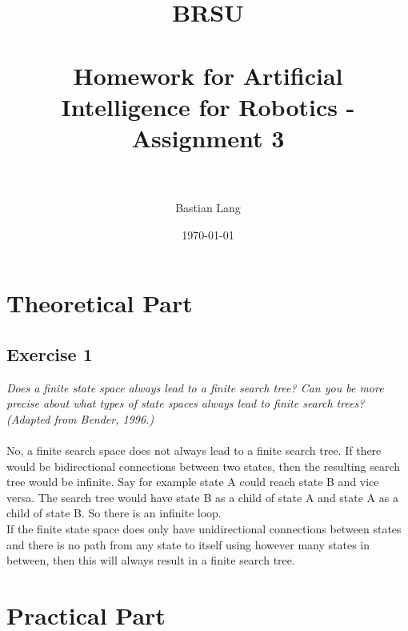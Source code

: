 \documentclass[paper=a4, fontsize=11pt]{scrartcl} %
\title{	
\normalfont \normalsize 
\textsc{BRSU} \\ [25pt] %
\horrule{0.5pt} \\[0.4cm] %
\huge Homework for Artificial Intelligence for Robotics - Assignment 3 \\ %
\horrule{2pt} \\[0.5cm] %
}
\author{Bastian Lang} %
\date{\normalsize\today} %
\numberwithin{equation}{section} %
\numberwithin{figure}{section} %
\numberwithin{table}{section} %
\begin{document}
\maketitle %

\section{Theoretical Part}
\subsection{Exercise 1}
\emph{Does a finite state space always lead to a finite search tree? Can you be more precise about
what types of state spaces always lead to finite search trees? (Adapted from Bender, 1996.)}\\\\

No, a finite search space does not always lead to a finite search tree. If there would be bidirectional connections between two states, then the resulting search tree would be infinite. Say for example state A could reach state B and vice versa. The search tree would have state B as a child of state A and state A as a child of state B. So there is an infinite loop.\\
If the finite state space does only have unidirectional connections between states and there is no path from any state to itself using however many states in between, then this will always result in a finite search tree. 

\section{Practical Part}
\end{document}
